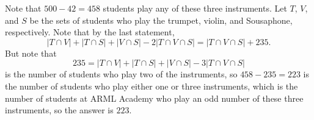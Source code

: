 Note that $500-42=458$ students play any of these three instruments. Let $T$, $V$, and $S$ be the sets of students who play the trumpet, violin, and Sousaphone, respectively. Note that by the last statement, \[\left|T\cap V\right|+\left|T\cap S\right|+\left|V\cap S\right|-2\left|T\cap V\cap S\right|=\left|T\cap V\cap S\right|+235.\] But note that \[235=\left|T\cap V\right|+\left|T\cap S\right|+\left|V\cap S\right|-3\left|T\cap V\cap S\right|\] is the number of students who play two of the instruments, so $458-235=223$ is the number of students who play either one or three instruments, which is the number of students at ARML Academy who play an odd number of these three instruments, so the answer is $\boxed{223}$.